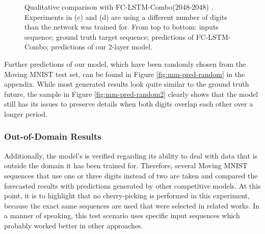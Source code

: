 \begin{figure}[h!tb]
\begin{subfigure}{0.49\textwidth}
  \caption{}
  \label{fig:mm-pred-spec-lstm4}
\end{subfigure}
\caption[Comparison with LSTM on Moving MNIST]{Qualitative comparison with FC-LSTM-Combo(2048-2048) \parencite{unsup_learn_lstm}. Experiments in (c) and (d) are using a different number of digits than the network was trained for. From top to bottom: inputs sequence; ground truth target sequence; predictions of FC-LSTM-Combo; predictions of our 2-layer model.} \label{fig:mm-pred-spec-lstm}
\end{figure}

Further predictions of our model, which have been randomly chosen from the Moving MNIST test set, can be found in Figure \ref{fig:mm-pred-random} in the appendix. While most generated results look quite similar to the ground truth future, the sample in Figure \ref{fig:mm-pred-random2} clearly shows that the model still has its issues to preserve details when both digits overlap each other over a longer period.


\subsubsection{Out-of-Domain Results}

Additionally, the model's is verified regarding its ability to deal with data that is outside the domain it has been trained for. Therefore, several Moving MNIST sequences that use one or three digits instead of two are taken and compared the forecasted results with predictions generated by other competitive models. At this point, it is to highlight that no cherry-picking is performed in this experiment, because the exact same sequences are used that were selected in related works. In a manner of speaking, this test scenario uses specific input sequences which probably worked better in other approaches.

